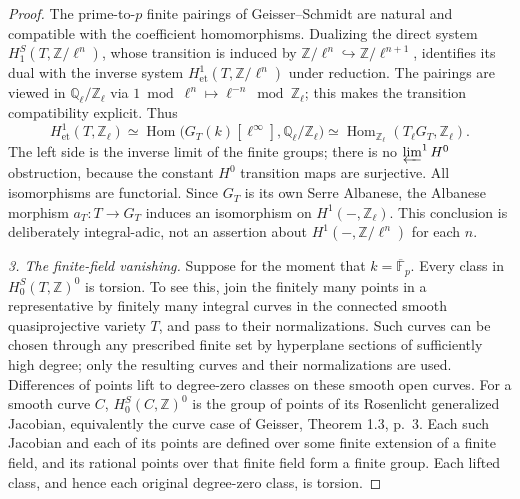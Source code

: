 \documentclass[11pt,a4paper]{article}
\theoremstyle{definition}\newtheorem{definition}[theorem]{Definition}
\theoremstyle{remark}\newtheorem{remark}[theorem]{Remark}
\begin{document}
\begin{proof}
The prime-to-$p$ finite pairings of Geisser--Schmidt are
natural and compatible with the coefficient homomorphisms.
Dualizing the direct system
$H_1^S(T,\mathbb Z/\ell^n)$, whose transition is induced by
$\mathbb Z/\ell^n\hookrightarrow\mathbb Z/\ell^{n+1}$,
identifies its dual with the inverse system
$H^1_{\mathrm{et}}(T,\mathbb Z/\ell^n)$ under reduction.
The pairings are viewed in $\mathbb Q_\ell/\mathbb Z_\ell$
via $1\bmod\ell^n\mapsto\ell^{-n}\bmod\mathbb Z_\ell$;
this makes the transition compatibility explicit. Thus
\[
 H^1_{\mathrm{et}}(T,\mathbb Z_\ell)
  \simeq\operatorname{Hom}\bigl(
       G_T(k)[\ell^\infty],\mathbb Q_\ell/\mathbb Z_\ell\bigr)
  \simeq\operatorname{Hom}_{\mathbb Z_\ell}
       (T_\ell G_T,\mathbb Z_\ell).                         \tag{AQ.14.6}
\]
The left side is the inverse limit of the finite groups;
there is no $\varprojlim^1 H^0$ obstruction, because the
constant $H^0$ transition maps are surjective. All
isomorphisms are functorial. Since $G_T$ is its own Serre
Albanese, the Albanese morphism $a_T:T\to G_T$ induces an
isomorphism on $H^1(-,\mathbb Z_\ell)$. This conclusion
is deliberately integral-adic, not an assertion about
$H^1(-,\mathbb Z/\ell^n)$ for each $n$.

\emph{3. The finite-field vanishing.}
Suppose for the moment that $k=\overline{\mathbb F}_p$.
Every class in $H_0^S(T,\mathbb Z)^0$ is torsion.
To see this, join the finitely many points in a representative
by finitely many integral curves in the connected smooth
quasiprojective variety $T$, and pass to their normalizations.
Such curves can be chosen through any prescribed finite
set by hyperplane sections of sufficiently high degree;
only the resulting curves and their normalizations are
used. Differences of points lift to degree-zero classes
on these smooth open curves. For a smooth curve $C$,
$H_0^S(C,\mathbb Z)^0$ is the group of points of its
Rosenlicht generalized Jacobian, equivalently the curve
case of Geisser, Theorem 1.3, p.~3. Each such Jacobian and
each of its points are defined over some finite extension
of a finite field, and its rational points over that
finite field form a finite group. Each lifted class,
and hence each original degree-zero class, is torsion.


\end{proof}
\end{document}
